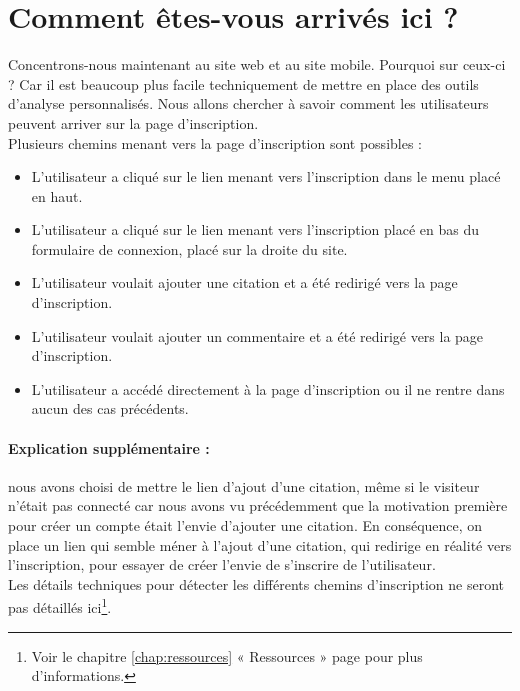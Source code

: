 \documentclass{report}
\begin{document}
	\section{Comment êtes-vous arrivés ici ?}
	Concentrons-nous maintenant au site web et au site mobile. Pourquoi sur ceux-ci ? Car il est beaucoup plus facile techniquement de mettre en place des outils d'analyse personnalisés. Nous allons chercher à savoir comment les utilisateurs peuvent arriver sur la page d'inscription.\\

	Plusieurs chemins menant vers la page d'inscription sont possibles :
	\vspace{10px}
	\begin{itemize}
		\item L'utilisateur a cliqué sur le lien menant vers l'inscription dans le menu placé en haut.
		\item L'utilisateur a cliqué sur le lien menant vers l'inscription placé en bas du formulaire de connexion, placé sur la droite du site.
		\item L'utilisateur voulait ajouter une citation et a été redirigé vers la page d'inscription.
		\item L'utilisateur voulait ajouter un commentaire et a été redirigé vers la page d'inscription.
		\item L'utilisateur a accédé directement à la page d'inscription ou il ne rentre dans aucun des cas précédents.
	\end{itemize}
	\vspace{10px}
	\paragraph{Explication supplémentaire :}nous avons choisi de mettre le lien d'ajout d'une citation, même si le visiteur n'était pas connecté car nous avons vu précédemment que la motivation première pour créer un compte était l'envie d'ajouter une citation. En conséquence, on place un lien qui semble méner à l'ajout d'une citation, qui redirige en réalité vers l'inscription, pour essayer de créer l'envie de s'inscrire de l'utilisateur.\\

	Les détails techniques pour détecter les différents chemins d'inscription ne seront pas détaillés ici\footnote{Voir le chapitre \ref{chap:ressources} « Ressources » page \pageref{chap:ressources} pour plus d'informations.}.\\
\end{document}
